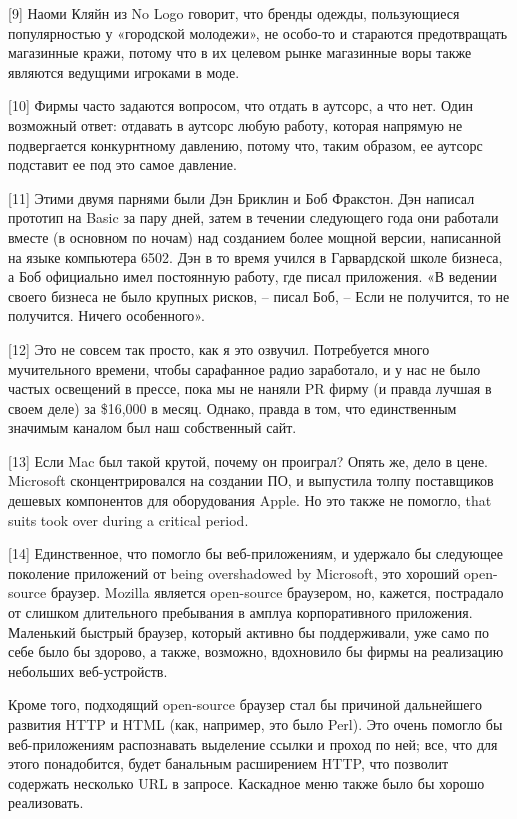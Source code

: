 \documentclass[ebook,12pt,oneside,openany]{memoir}
\begin{document}
[9] Наоми Кляйн из No Logo говорит, что бренды одежды, пользующиеся
популярностью у «городской молодежи», не особо-то и стараются
предотвращать магазинные кражи, потому что в их целевом рынке
магазинные воры также являются ведущими игроками в моде.

[10] Фирмы часто задаются вопросом, что отдать в аутсорс, а что нет.
Один возможный ответ: отдавать в аутсорс любую работу, которая
напрямую не подвергается конкурнтному давлению, потому что, таким
образом, ее аутсорс подставит ее под это самое давление.

[11] Этими двумя парнями были Дэн Бриклин и Боб Фракстон. Дэн написал
прототип на Basic за пару дней, затем в течении следующего года они
работали вместе (в основном по ночам) над созданием более мощной
версии, написанной на языке компьютера 6502. Дэн в то время учился в
Гарвардской школе бизнеса, а Боб официально имел постоянную работу,
где писал приложения. «В ведении своего бизнеса не было крупных
рисков, – писал Боб, – Если не получится, то не получится. Ничего
особенного».

[12] Это не совсем так просто, как я это озвучил. Потребуется много
мучительного времени, чтобы сарафанное радио заработало, и у нас не
было частых освещений в прессе, пока мы не наняли PR фирму (и правда
лучшая в своем деле) за \$16,000 в месяц. Однако, правда в том, что
единственным значимым каналом был наш собственный сайт.

[13] Если Mac был такой крутой, почему он проиграл? Опять же, дело в
цене. Microsoft сконцентрировался на создании ПО, и выпустила толпу
поставщиков дешевых компонентов для оборудования Apple. Но это также
не помогло, that suits took over during a critical period.

[14] Единственное, что помогло бы веб-приложениям, и удержало бы
следующее поколение приложений от being overshadowed by Microsoft, это
хороший open-source браузер. Mozilla является open-source браузером,
но, кажется, пострадало от слишком длительного пребывания в амплуа
корпоративного приложения. Маленький быстрый браузер, который активно
бы поддерживали, уже само по себе было бы здорово, а также, возможно,
вдохновило бы фирмы на реализацию небольших веб-устройств.

Кроме того, подходящий open-source браузер стал бы причиной
дальнейшего развития HTTP и HTML (как, например, это было Perl). Это
очень помогло бы веб-приложениям распознавать выделение ссылки и
проход по ней; все, что для этого понадобится, будет банальным
расширением HTTP, что позволит содержать несколько URL в запросе.
Каскадное меню также было бы хорошо реализовать.
\end{document}
